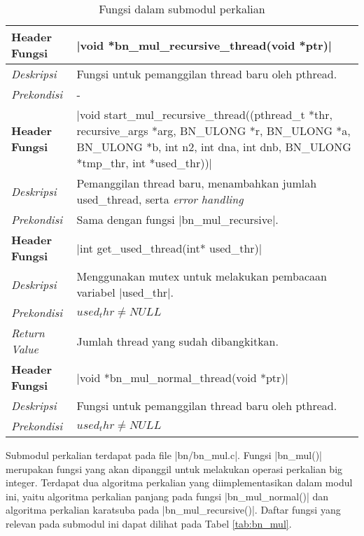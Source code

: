 \begin{table}[h]
    \small
  \caption{Fungsi dalam submodul perkalian}
  \label{tab:bn_mul_par}
  \begin{tabular}{R{2.8cm}L{10.5cm}}

    \toprule
    \textbf{Header Fungsi} & |void *bn_mul_recursive_thread(void *ptr)| \\ \midrule
    \textit{Deskripsi}     & Fungsi untuk pemanggilan thread baru oleh pthread.\\
    \textit{Prekondisi}    & -\\
    \bottomrule

    \textbf{Header Fungsi} & |void start_mul_recursive_thread((pthread_t *thr, recursive_args *arg, BN_ULONG *r, BN_ULONG *a, BN_ULONG *b, int n2, int dna, int dnb, BN_ULONG *tmp_thr, int *used_thr))| \\ \midrule
    \textit{Deskripsi}     & Pemanggilan thread baru, menambahkan jumlah used\_thread, serta \textit{error handling}\\
    \textit{Prekondisi}    & Sama dengan fungsi |bn_mul_recursive|.\\
    \bottomrule

    \textbf{Header Fungsi} & |int get_used_thread(int* used_thr)| \\ \midrule
    \textit{Deskripsi}     & Menggunakan mutex untuk melakukan pembacaan variabel |used_thr|.\\
    \textit{Prekondisi}    & $used_thr \neq NULL$\\
    \textit{Return Value}  & Jumlah thread yang sudah dibangkitkan. \\
    \bottomrule

    \textbf{Header Fungsi} & |void *bn_mul_normal_thread(void *ptr)| \\ \midrule
    \textit{Deskripsi}     & Fungsi untuk pemanggilan thread baru oleh pthread.\\
    \textit{Prekondisi}    & $used_thr \neq NULL$\\
    \bottomrule
  \end{tabular}
\end{table}

  Submodul perkalian terdapat pada file |bn/bn_mul.c|. Fungsi |bn_mul()| merupakan fungsi yang akan dipanggil untuk melakukan operasi perkalian big integer. Terdapat dua algoritma perkalian yang diimplementasikan dalam modul ini, yaitu algoritma perkalian panjang pada fungsi |bn_mul_normal()| dan algoritma perkalian karatsuba pada |bn_mul_recursive()|. Daftar fungsi yang relevan pada submodul ini dapat dilihat pada Tabel \ref{tab:bn_mul}.


